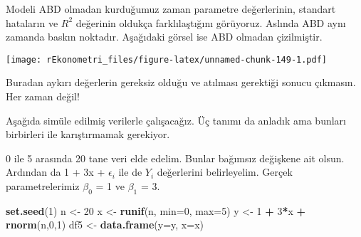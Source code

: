 \documentclass[
]{book}
\newenvironment{Shaded}{\begin{snugshade}}{\end{snugshade}}
\newcommand{\DataTypeTok}[1]{\textcolor[rgb]{0.13,0.29,0.53}{#1}}
\newcommand{\DecValTok}[1]{\textcolor[rgb]{0.00,0.00,0.81}{#1}}
\newcommand{\KeywordTok}[1]{\textcolor[rgb]{0.13,0.29,0.53}{\textbf{#1}}}
\newcommand{\NormalTok}[1]{#1}
\newcommand{\OperatorTok}[1]{\textcolor[rgb]{0.81,0.36,0.00}{\textbf{#1}}}
\newcommand{\OtherTok}[1]{\textcolor[rgb]{0.56,0.35,0.01}{#1}}
\newcommand{\StringTok}[1]{\textcolor[rgb]{0.31,0.60,0.02}{#1}}
\begin{document}
Modeli ABD olmadan kurduğumuz zaman parametre değerlerinin, standart hataların ve \(R^2\) değerinin oldukça farklılaştığını görüyoruz. Aslında ABD aynı zamanda baskın noktadır. Aşağıdaki görsel ise ABD olmadan çizilmiştir.

\begin{Shaded}
\end{Shaded}

\texttt{[image: rEkonometri\_files/figure-latex/unnamed-chunk-149-1.pdf]}

Buradan aykırı değerlerin gereksiz olduğu ve atılması gerektiği sonucu çıkmasın. Her zaman değil!

Aşağıda simüle edilmiş verilerle çalışacağız. Üç tanımı da anladık ama bunları birbirleri ile karıştırmamak gerekiyor.

0 ile 5 arasında 20 tane veri elde edelim. Bunlar bağımsız değişkene ait olsun. Ardından da 1 + 3x + \(\epsilon_i\) ile de \(Y_i\) değerlerini belirleyelim. Gerçek parametrelerimiz \(β_0\) = 1 ve \(β_1\) = 3.

\begin{Shaded}
\begin{Highlighting}[]
\KeywordTok{set.seed}\NormalTok{(}\DecValTok{1}\NormalTok{)}
\NormalTok{n <-}\StringTok{ }\DecValTok{20}
\NormalTok{x <-}\StringTok{ }\KeywordTok{runif}\NormalTok{(n, }\DataTypeTok{min=}\DecValTok{0}\NormalTok{, }\DataTypeTok{max=}\DecValTok{5}\NormalTok{)}
\NormalTok{y <-}\StringTok{ }\DecValTok{1} \OperatorTok{+}\StringTok{ }\DecValTok{3}\OperatorTok{*}\NormalTok{x }\OperatorTok{+}\StringTok{ }\KeywordTok{rnorm}\NormalTok{(n,}\DecValTok{0}\NormalTok{,}\DecValTok{1}\NormalTok{)}
\NormalTok{df5 <-}\StringTok{ }\KeywordTok{data.frame}\NormalTok{(}\DataTypeTok{y=}\NormalTok{y, }\DataTypeTok{x=}\NormalTok{x)}
\end{Highlighting}
\end{Shaded}
\end{document}
